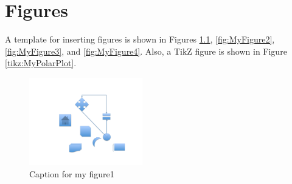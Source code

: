 









\chapter{Figures}
\label{chp:Figures}

A template for inserting figures is shown in Figures \ref{fig:MyFigure1}, \ref{fig:MyFigure2}, \ref{fig:MyFigure3}, and \ref{fig:MyFigure4}. Also, a TikZ figure is shown in Figure \ref{tikz:MyPolarPlot}.

\begin{figure}[h]
\centering 
\includegraphics[height=1.5in]{./pics/short}
\caption{Caption for my figure1}
\label{fig:MyFigure1}
\end{figure}

